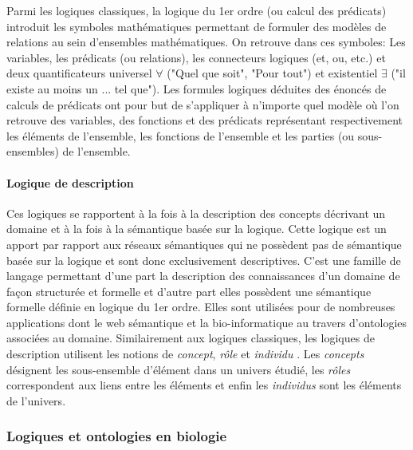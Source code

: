 Parmi les logiques classiques, la logique du 1er ordre (ou calcul des prédicats) introduit les symboles mathématiques permettant de formuler des modèles de relations au sein d'ensembles mathématiques. On retrouve dans ces symboles: Les variables, les prédicats (ou relations), les connecteurs logiques (et, ou, etc.) et deux quantificateurs universel $\forall$ ("Quel que soit", "Pour tout") et existentiel $\exists$ ("il existe au moins un ... tel que"). Les formules logiques déduites des énoncés de calculs de prédicats ont pour but de s'appliquer à n'importe quel modèle où l'on retrouve des variables, des fonctions et des prédicats représentant respectivement les éléments de l'ensemble, les fonctions de l'ensemble et les parties (ou sous-ensembles) de l'ensemble.


\paragraph{Logique de description}

Ces logiques se rapportent à la fois à la description des concepts décrivant un domaine et à la fois à la sémantique basée sur la logique. Cette logique est un apport par rapport aux réseaux sémantiques qui ne possèdent pas de sémantique basée sur la logique et sont donc exclusivement descriptives. C'est une famille de langage permettant d'une part la description des connaissances d'un domaine de façon structurée et formelle et d'autre part elles possèdent une sémantique formelle définie en logique du 1er ordre. Elles sont utilisées pour de nombreuses applications dont le web sémantique et la bio-informatique au travers d'ontologies associées au domaine. 
Similairement aux logiques classiques, les logiques de description utilisent les notions de \textit{concept}, \textit{rôle} et \textit{individu} \cite{baader2003description}. Les \textit{concepts} désignent les sous-ensemble d'élément dans un univers étudié, les \textit{rôles} correspondent aux liens entre les éléments et enfin les \textit{individus} sont les éléments de l'univers.


\subsubsection{Logiques et ontologies en biologie}

